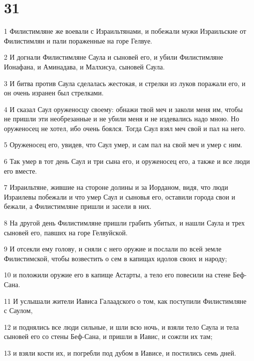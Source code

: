 \chapter{31}

\par 1 Филистимляне же воевали с Израильтянами, и побежали мужи Израильские от Филистимлян и пали пораженные на горе Гелвуе.
\par 2 И догнали Филистимляне Саула и сыновей его, и убили Филистимляне Ионафана, и Аминадава, и Малхисуа, сыновей Саула.
\par 3 И битва против Саула сделалась жестокая, и стрелки из луков поражали его, и он очень изранен был стрелками.
\par 4 И сказал Саул оруженосцу своему: обнажи твой меч и заколи меня им, чтобы не пришли эти необрезанные и не убили меня и не издевались надо мною. Но оруженосец не хотел, ибо очень боялся. Тогда Саул взял меч свой и пал на него.
\par 5 Оруженосец его, увидев, что Саул умер, и сам пал на свой меч и умер с ним.
\par 6 Так умер в тот день Саул и три сына его, и оруженосец его, а также и все люди его вместе.
\par 7 Израильтяне, жившие на стороне долины и за Иорданом, видя, что люди Израилевы побежали и что умер Саул и сыновья его, оставили города свои и бежали, а Филистимляне пришли и засели в них.
\par 8 На другой день Филистимляне пришли грабить убитых, и нашли Саула и трех сыновей его, павших на горе Гелвуйской.
\par 9 И отсекли ему голову, и сняли с него оружие и послали по всей земле Филистимской, чтобы возвестить о сем в капищах идолов своих и народу;
\par 10 и положили оружие его в капище Астарты, а тело его повесили на стене Беф-Сана.
\par 11 И услышали жители Иависа Галаадского о том, как поступили Филистимляне с Саулом,
\par 12 и поднялись все люди сильные, и шли всю ночь, и взяли тело Саула и тела сыновей его со стены Беф-Сана, и пришли в Иавис, и сожгли их там;
\par 13 и взяли кости их, и погребли под дубом в Иависе, и постились семь дней.


